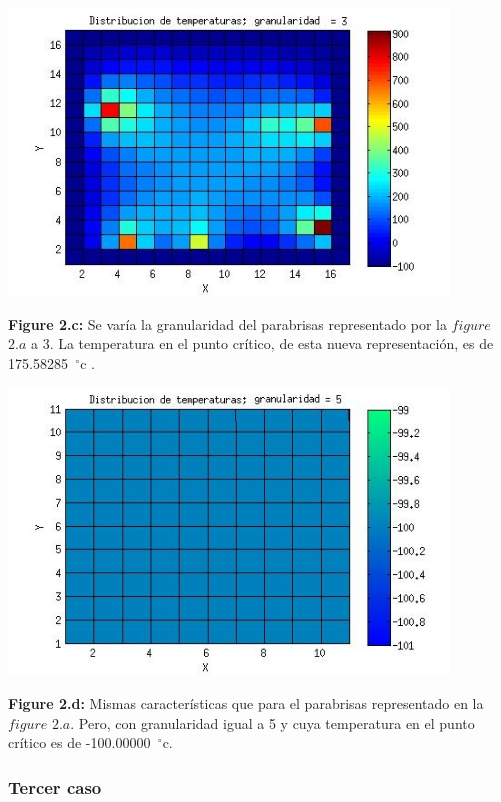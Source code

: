 \includegraphics[width=\textwidth,height=3.0in,keepaspectratio
]{45x45h3.jpg} \newline
\begin {flushleft}
\textbf{Figure 2.c:} Se varía la granularidad del parabrisas representado por la $figure$ $2.a$ a 3. La temperatura en el punto crítico, de esta nueva representación, es de 175.58285\hspace{-1.5mm}$\phantom{a}^{\circ}$c .
\end{flushleft}

\includegraphics[width=\textwidth,height=3.0in,keepaspectratio
]{45x45h5.jpg} \newline
\begin {flushleft}
\textbf{Figure 2.d:} Mismas características que para el parabrisas representado en la $figure$ $2.a$. Pero, con granularidad igual a 5 y cuya temperatura en el punto crítico es de -100.00000\hspace{-1.5mm}$\phantom{a}^{\circ}$c.
\end{flushleft}


\subsubsection{Tercer caso}


